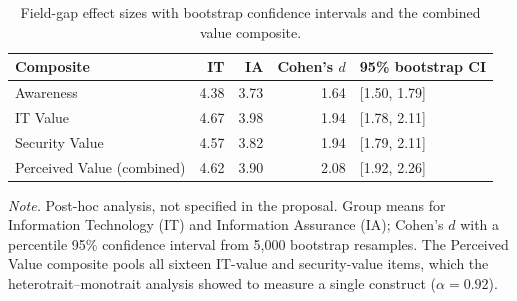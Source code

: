 \begin{table}[htbp]\centering
\caption{Field-gap effect sizes with bootstrap confidence intervals and the combined value composite.}\label{tab:robustness_extra}
\small
\begin{tabular}{@{}lrrrl@{}}\toprule
\textbf{Composite} & \textbf{IT} & \textbf{IA} & \textbf{Cohen's }$d$ & \textbf{95\% bootstrap CI} \\ \midrule
Awareness & 4.38 & 3.73 & 1.64 & [1.50, 1.79] \\
IT Value & 4.67 & 3.98 & 1.94 & [1.78, 2.11] \\
Security Value & 4.57 & 3.82 & 1.94 & [1.79, 2.11] \\
Perceived Value (combined) & 4.62 & 3.90 & 2.08 & [1.92, 2.26] \\
\bottomrule
\end{tabular}
\smallskip

{\footnotesize \textit{Note.} Post-hoc analysis, not specified in the proposal. Group means for Information
Technology (IT) and Information Assurance (IA); Cohen's $d$ with a percentile 95\% confidence interval from
5{,}000 bootstrap resamples. The Perceived Value composite pools all sixteen IT-value and security-value
items, which the heterotrait--monotrait analysis showed to measure a single construct ($\alpha=0.92$).}
\end{table}